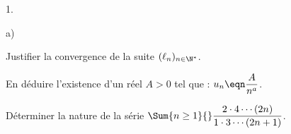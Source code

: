 \documentclass[11pt]{article}%
\begin{document}
\begin{exerciceAP}
\begin{noliste}{1.}
  \item 
    \begin{noliste}{a)}
    \item Justifier la convergence de la suite $(\ell_n)_{n \in \N^*}$.
      
    \item En déduire l'existence d'un réel $A>0$ tel que : $u_n \eqn
      \dfrac{A}{n^a}$.
    \end{noliste}
    
  \item Déterminer la nature de la série $\Sum{n \geq 1}{} \dfrac{2
      \cdot 4 \cdots (2n)}{1 \cdot 3 \cdots (2n+1)}$.
  \end{noliste}
\end{exerciceAP}


\newpage
\end{document}
